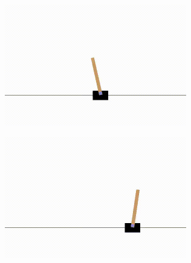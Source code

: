 \documentclass[
  letterpaper,
  DIV=11,
  numbers=noendperiod,
  oneside]{scrartcl}
\begin{document}

\subsection{}\label{section-14}

\begin{figure}

\begin{minipage}{0.50\linewidth}

\begin{figure}[H]

{\centering \includegraphics[width=3.125in,height=\textheight]{videos/dqn/episode-398.gif}

}


\end{figure}%

\end{minipage}%
%
\begin{minipage}{0.50\linewidth}

\begin{figure}[H]

{\centering \includegraphics[width=3.125in,height=\textheight]{videos/dqn/episode-6965.gif}

}
\end{figure}
\end{minipage}
\end{figure}
\end{document}
